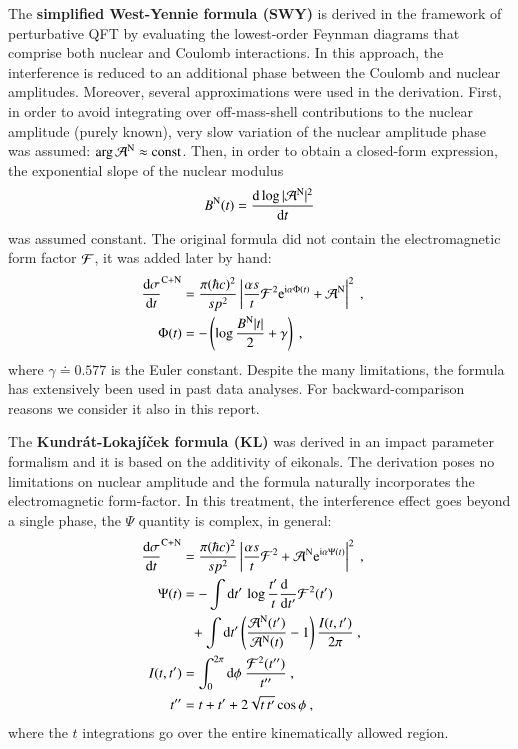 The {\bf simplified West-Yennie formula (SWY)} \cite{wy68} is derived in the framework of perturbative QFT by evaluating the lowest-order Feynman diagrams that comprise both nuclear and Coulomb interactions. In this approach, the interference is reduced to an additional phase between the Coulomb and nuclear amplitudes. Moreover, several approximations were used in the derivation. First, in order to avoid integrating over off-mass-shell contributions to the nuclear amplitude (purely known), very slow variation of the nuclear amplitude phase was assumed: $\arg {\cal A}^{\rm N} \approx \hbox{const}$. Then, in order to obtain a closed-form expression, the exponential slope of the nuclear modulus
\begin{equation}
B^{\rm N}(t) = {\d \log |{\cal A}^{\rm N}|^2 \over \d t}
\end{equation}
was assumed constant. The original formula did not contain the electromagnetic form factor ${\cal F}$, it was added later by hand:
\begin{equation}
\label{eq:int swy}
	\begin{aligned}
		{\d\sigma\over \d t}^{\rm C+N} &= {\pi (\hbar c)^2 \over s p^2} \left | {\alpha s\over t} {\cal F}^2 \e^{\I\alpha \Phi(t)} + {\cal A}^{\rm N} \right |^2\ ,\cr
		\Phi(t) &= - \left( \log {B^{\rm N} |t|\over 2} + \gamma \right)\ ,\cr
	\end{aligned}
\end{equation}
where $\gamma \doteq 0.577$ is the Euler constant. Despite the many limitations, the formula has extensively been used in past data analyses. For backward-comparison reasons we consider it also in this report.

The {\bf Kundr\' at-Lokaj\' i\v cek formula (KL)} \cite{kl94} was derived in an impact parameter formalism and it is based on the additivity of eikonals. The derivation poses no limitations on nuclear amplitude and the formula naturally incorporates the electromagnetic form-factor. In this treatment, the interference effect goes beyond a single phase, the $\Psi$ quantity is complex, in general:
\begin{equation}
\label{eq:int kl}
	\begin{aligned}
		{\d\sigma\over \d t}^{\rm C+N} &= {\pi (\hbar c)^2 \over s p^2} \left | {\alpha s\over t} {\cal F}^2 + {\cal A}^{\rm N} \e^{\I\alpha \Psi(t)} \right |^2\ ,\cr
		\Psi(t) &= 
			- \int \d t'\, \log {t'\over t} {\d\phantom{t'}\over \d t'} {\cal F}^2(t') \cr
		&\phantom{=} + \int \d t' \left( {{\cal A}^{\rm N}(t') \over {\cal A}^{\rm N}(t)} - 1 \right) { I(t, t')\over 2\pi }
			\ ,\cr
		I(t, t') &= \int_0^{2\pi} \d\phi\ {{\cal F}^2(t'')\over t''}\ , \cr
		t'' &= t + t' + 2\sqrt{t\, t'} \cos\phi\ ,\cr
	\end{aligned}
\end{equation}
where the $t$ integrations go over the entire kinematically allowed region.

